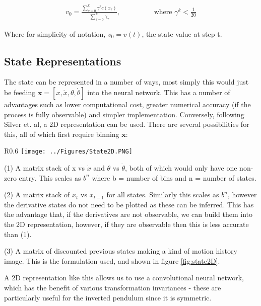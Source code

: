\documentclass[main.tex]{subfiles}
\begin{document}
\begin{align}
   v_0 = \frac{\sum_{\tau=0}^{k} \gamma^\tau c(x_\tau ) }{\sum_{\tau = 0}^k \gamma_\tau}, \hspace{2cm} \text{where } \gamma^k < \frac{1}{20}
\end{align}

Where for simplicity of notation, $v_0 = v(t)$, the state value at step t.

\subsection{State Representations}

The state can be represented in a number of ways, most simply this would just be feeding $\boldsymbol{x} = [x, \dot{x}, \theta, \dot{\theta}]$ into the neural network. This has a number of advantages such as lower computational cost, greater numerical accuracy (if the process is fully observable) and simpler implementation. Conversely, following Silver et. al, a 2D representation can be used. There are several possibilities for this, all of which first require binning $\boldsymbol{x}$:

\begin{wrapfigure}{R}{0.6\textwidth}
   \centering
   \texttt{[image: ../Figures/State2D.PNG]}
   \vspace{-20pt}
   \caption{An example of a 2D state representation where there are 20 bins and 17 random actions have been taken.}
   \label{fig:state2D}
\end{wrapfigure}

(1) A matrix stack of x vs $\dot{x}$ and $\theta$ vs $\dot{\theta}$, both of which would only have one non-zero entry. This scales as $b^n$ where b = number of bins and n = number of states.

(2) A matrix stack of $x_t$ vs $x_{t-1}$ for all states. Similarly this scales as $b^n$, however the derivative states do not need to be plotted as these can be inferred. This has the advantage that, if the derivatives are not observable, we can build them into the 2D representation, however, if they are observable then this is less accurate than (1).

(3) A matrix of discounted previous states making a kind of motion history image. This is the formulation used, and shown in figure \ref{fig:state2D}.

A 2D representation like this allows us to use a convolutional neural network, which has the benefit of various transformation invariances - these are particularly useful for the inverted pendulum since it is symmetric.
\end{document}
